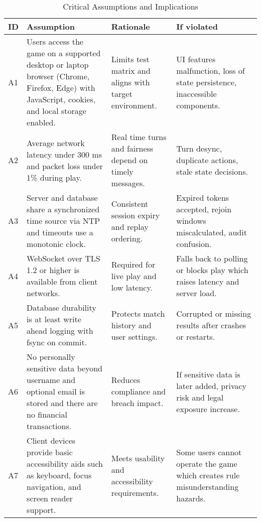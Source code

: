 \documentclass{article}
\begin{document}
\begin{table}[H]
\caption{Critical Assumptions and Implications}\label{tab:assumptions}
\begin{tabularx}{\textwidth}{lX X X}
\toprule
\textbf{ID} & \textbf{Assumption} & \textbf{Rationale} & \textbf{If violated} \\
\midrule
A1 & Users access the game on a supported desktop or laptop browser (Chrome, Firefox, Edge) with JavaScript, cookies, and local storage enabled. & Limits test matrix and aligns with target environment. & UI features malfunction, loss of state persistence, inaccessible components. \\
A2 & Average network latency under 300 ms and packet loss under 1\% during play. & Real time turns and fairness depend on timely messages. & Turn desync, duplicate actions, stale state decisions. \\
A3 & Server and database share a synchronized time source via NTP and timeouts use a monotonic clock. & Consistent session expiry and replay ordering. & Expired tokens accepted, rejoin windows miscalculated, audit confusion. \\
A4 & WebSocket over TLS 1.2 or higher is available from client networks. & Required for live play and low latency. & Falls back to polling or blocks play which raises latency and server load. \\
A5 & Database durability is at least write ahead logging with fsync on commit. & Protects match history and user settings. & Corrupted or missing results after crashes or restarts. \\
A6 & No personally sensitive data beyond username and optional email is stored and there are no financial transactions. & Reduces compliance and breach impact. & If sensitive data is later added, privacy risk and legal exposure increase. \\
A7 & Client devices provide basic accessibility aids such as keyboard, focus navigation, and screen reader support. & Meets usability and accessibility requirements. & Some users cannot operate the game which creates rule misunderstanding hazards. \\
\bottomrule
\end{tabularx}
\end{table}

\newpage{}
\end{document}

